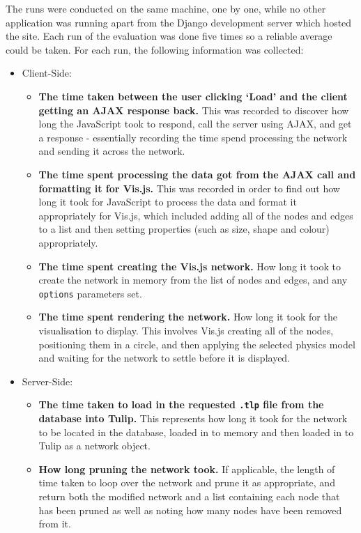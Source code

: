 \documentclass[../dissertation.tex]{subfiles}
\begin{document}
The runs were conducted on the same machine, one by one, while no other application was running apart from the Django development server which hosted the site. Each run of the evaluation was done five times so a reliable average could be taken. For each run, the following information was collected:

\begin{itemize}
    \item Client-Side:
    \begin{itemize}
        \item \textbf{The time taken between the user clicking `Load' and the client getting an AJAX response back.} This was recorded to discover how long the JavaScript took to respond, call the server using AJAX, and get a response - essentially recording the time spend processing the network and sending it across the network.
        \item \textbf{The time spent processing the data got from the AJAX call and formatting it for Vis.js.} This was recorded in order to find out how long it took for JavaScript to process the data and format it appropriately for Vis.js, which included adding all of the nodes and edges to a list and then setting properties (such as size, shape and colour) appropriately.
        \item \textbf{The time spent creating the Vis.js network.} How long it took to create the network in memory from the list of nodes and edges, and any \texttt{options} parameters set.
        \item \textbf{The time spent rendering the network.} How long it took for the visualisation to display. This involves Vis.js creating all of the nodes, positioning them in a circle, and then applying the selected physics model and waiting for the network to settle before it is displayed.
    \end{itemize}
    \item Server-Side:
    \begin{itemize}
        \item \textbf{The time taken to load in the requested \texttt{.tlp} file from the database into Tulip.} This represents how long it took for the network to be located in the database, loaded in to memory and then loaded in to Tulip as a network object.
        \item \textbf{How long pruning the network took.} If applicable, the length of time taken to loop over the network and prune it as appropriate, and return both the modified network and a list containing each node that has been pruned as well as noting how many nodes have been removed from it.

\end{itemize}
\end{itemize}
\end{document}
